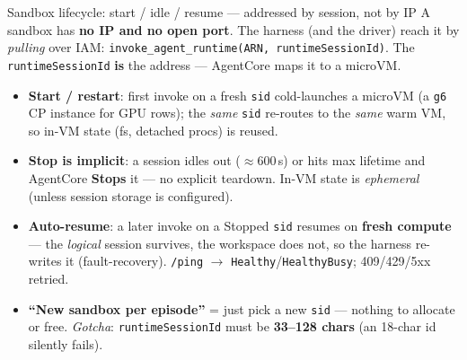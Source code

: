 \documentclass[aspectratio=169]{beamer}
\begin{document}
\begin{frame}{Sandbox lifecycle: start / idle / resume --- addressed by session, not by IP}
  \footnotesize A sandbox has \textbf{no IP and no open port}. The harness (and the driver) reach it
  by \emph{pulling} over IAM: \texttt{invoke\_agent\_runtime(ARN, runtimeSessionId)}. The
  \texttt{runtimeSessionId} \textbf{is} the address --- AgentCore maps it to a microVM.
  \begin{center}
  \end{center}
  \vspace{-0.3em}
  \begin{itemize}\setlength\itemsep{0.03em}
    \item \textbf{Start / restart}: first invoke on a fresh \texttt{sid} cold-launches a microVM (a
      \texttt{g6} CP instance for GPU rows); the \emph{same} \texttt{sid} re-routes to the \emph{same}
      warm VM, so in-VM state (fs, detached procs) is reused.
    \item \textbf{Stop is implicit}: a session idles out ($\approx$600\,s) or hits max lifetime and
      AgentCore \textbf{Stops} it --- no explicit teardown. In-VM state is \emph{ephemeral} (unless
      session storage is configured).
    \item \textbf{Auto-resume}: a later invoke on a Stopped \texttt{sid} resumes on \textbf{fresh
      compute} --- the \emph{logical} session survives, the workspace does not, so the harness
      re-writes it (fault-recovery). \texttt{/ping} $\to$ \texttt{Healthy}/\texttt{HealthyBusy}; 409/429/5xx retried.
    \item \textbf{``New sandbox per episode''} = just pick a new \texttt{sid} --- nothing to allocate
      or free. \emph{Gotcha}: \texttt{runtimeSessionId} must be \textbf{33--128 chars} (an 18-char id silently fails).
  \end{itemize}
\end{frame}
\end{document}
